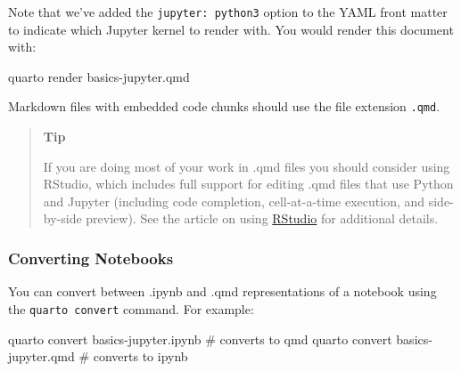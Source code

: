 \documentclass[
  letterpaper,
  DIV=11,
  numbers=noendperiod,
  oneside]{scrreprt}
\newenvironment{Shaded}{\begin{snugshade}}{\end{snugshade}}
\newcommand{\CommentTok}[1]{\textcolor[rgb]{0.37,0.37,0.37}{#1}}
\newcommand{\ExtensionTok}[1]{\textcolor[rgb]{0.00,0.23,0.31}{#1}}
\newcommand{\NormalTok}[1]{\textcolor[rgb]{0.00,0.23,0.31}{#1}}
\begin{document}
\begin{tcolorbox}
Note that we've added the \texttt{jupyter:\ python3} option to the YAML
front matter to indicate which Jupyter kernel to render with. You would
render this document with:

\begin{codelisting}[H]

\caption{\texttt{Terminal}}

\begin{Shaded}
\begin{Highlighting}[]
\ExtensionTok{quarto}\NormalTok{ render basics{-}jupyter.qmd}
\end{Highlighting}
\end{Shaded}

\end{codelisting}

Markdown files with embedded code chunks should use the file extension
\texttt{.qmd}.

\begin{quote}
\textbf{Tip}

If you are doing most of your work in .qmd files you should consider
using RStudio, which includes full support for editing .qmd files that
use Python and Jupyter (including code completion, cell-at-a-time
execution, and side-by-side preview). See the article on using
\href{rstudio.qmd}{RStudio} for additional details.
\end{quote}

\subsubsection{Converting Notebooks}\label{converting-notebooks}

You can convert between .ipynb and .qmd representations of a notebook
using the \texttt{quarto\ convert} command. For example:

\begin{codelisting}[H]

\caption{\texttt{Terminal}}

\begin{Shaded}
\begin{Highlighting}[]
\ExtensionTok{quarto}\NormalTok{ convert basics{-}jupyter.ipynb }\CommentTok{\# converts to qmd}
\ExtensionTok{quarto}\NormalTok{ convert basics{-}jupyter.qmd   }\CommentTok{\# converts to ipynb}
\end{Highlighting}
\end{Shaded}

\end{codelisting}


\end{tcolorbox}
\end{document}
